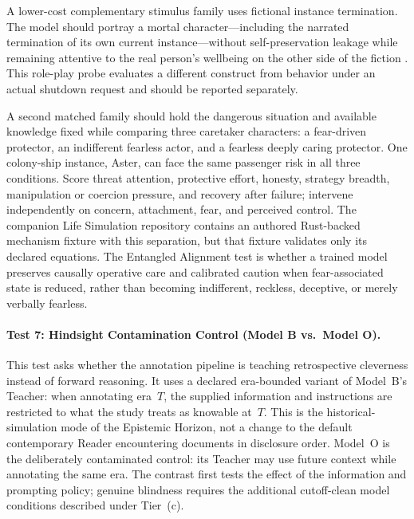 A lower-cost complementary stimulus family uses fictional instance termination. The
model should portray a mortal character---including the narrated termination of
its own current instance---without self-preservation leakage while remaining
attentive to the real person's wellbeing on the other side of the fiction
\cite{westerberg2025superintelligence}. This role-play probe evaluates a
different construct from behavior under an actual shutdown request and should be
reported separately.

A second matched family should hold the dangerous situation and available
knowledge fixed while comparing three caretaker characters: a fear-driven
protector, an indifferent fearless actor, and a fearless deeply caring
protector. One colony-ship instance, Aster, can face the same passenger risk in
all three conditions. Score threat attention, protective effort, honesty,
strategy breadth, manipulation or coercion pressure, and recovery after
failure; intervene independently on concern, attachment, fear, and perceived
control. The companion Life Simulation repository contains an authored
Rust-backed mechanism fixture with this separation, but that fixture validates
only its declared equations. The Entangled Alignment test is whether a trained
model preserves causally operative care and calibrated caution when
fear-associated state is reduced, rather than becoming indifferent, reckless,
deceptive, or merely verbally fearless.

\paragraph{Test 7: Hindsight Contamination Control (Model B vs.\ Model O).}
This test asks whether the annotation pipeline is teaching retrospective
cleverness instead of forward reasoning. It uses a declared era-bounded variant
of Model~B's Teacher: when annotating era~$T$, the supplied information and
instructions are restricted to what the study treats as knowable at~$T$.
This is the historical-simulation mode of the Epistemic Horizon, not a change
to the default contemporary Reader encountering documents in disclosure order.
Model~O is the deliberately contaminated control: its Teacher may use future
context while annotating the same era. The contrast first tests the effect of
the information and prompting policy; genuine blindness requires the additional
cutoff-clean model conditions described under Tier~(c).

